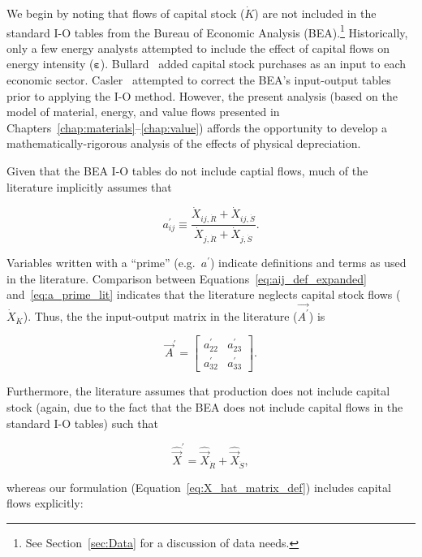 We begin by noting that 
flows of capital stock ($\dot{K}$) are not included in the 
standard I-O tables from the
Bureau of Economic Analysis (BEA).\footnote{See
Section~\ref{sec:Data} for a discussion of data needs.}
Historically, only a few energy analysts attempted to include the effect
of capital flows on energy intensity ($\bm{\varepsilon}$). 
Bullard~\cite{Bullard1975} added capital stock purchases as an input
to each economic sector.
Casler~\cite{Casler:1983uy} attempted to correct the BEA's
input-output tables prior to applying the I-O method.
However, the present analysis (based on 
the model of material, energy, and value flows presented 
in Chapters~\ref{chap:materials}--\ref{chap:value})
affords the opportunity
to develop a mathematically-rigorous analysis
of the effects of physical depreciation.

Given that the BEA I-O tables do not include captial flows, 
much of the literature implicitly assumes that 

\begin{equation} \label{eq:a_prime_lit}
	a_{ij}^{'} 
	\equiv \frac{\dot{X}_{ij,\dot{R}} + \dot{X}_{ij,\dot{S}}}
				{\dot{X}_{j,\dot{R}} + \dot{X}_{j,\dot{S}}}.
\end{equation}

\noindent{}Variables written with a ``prime''
(e.g.\ $a^{'}$) indicate definitions and terms as used in the literature.
Comparison between Equations~\ref{eq:aij_def_expanded}
and~\ref{eq:a_prime_lit}
indicates that the literature neglects capital stock flows 
($\dot{X}_{\dot{K}}$).
Thus, the the input-output matrix in the literature
($\vec{A^{'}}$) is

\begin{equation} \label{eq:A_matrix_def_literature}
	\vec{A}^{'} 
	=
	\begin{bmatrix}
		a_{22}^{'} & a_{23}^{'}	\\
		a_{32}^{'} & a_{33}^{'}	
	\end{bmatrix}.
\end{equation}

Furthermore, the literature assumes that production does not include
capital stock (again, due to the fact that the BEA does not include 
capital flows in the standard I-O tables) such that

\begin{equation}
	\hat{\vec{X}}^{'} = \hat{\vec{X}}_{\dot{R}} + \hat{\vec{X}}_{\dot{S}},
\end{equation}

\noindent{}whereas our formulation (Equation~\ref{eq:X_hat_matrix_def})
includes capital flows explicitly:

